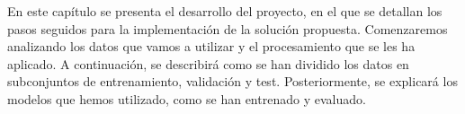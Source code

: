 En este capítulo se presenta el desarrollo del proyecto, en el que se detallan los pasos seguidos para la implementación de la solución propuesta. Comenzaremos analizando los datos que vamos a utilizar y el procesamiento que se les ha aplicado. A continuación, se describirá como se han dividido los datos en subconjuntos de entrenamiento, validación y test. Posteriormente, se explicará los modelos que hemos utilizado, como se han entrenado y evaluado.